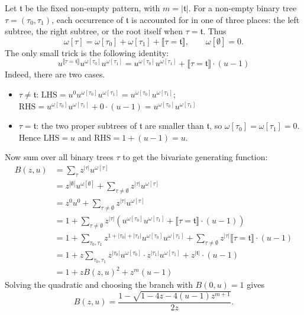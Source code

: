 Let $\mathfrak{t}$ be the fixed non-empty pattern, with $m=|\mathfrak{t}|$. For a non-empty
binary tree $\tau=(\tau_0,\tau_1)$, each occurrence of $\mathfrak{t}$ is accounted for in
one of three places: the left subtree, the right subtree, or the root itself when
$\tau=\mathfrak{t}$. Thus
\begin{equation*}
    \omega[\tau]=\omega[\tau_0]+\omega[\tau_1]+\llbracket \tau=\mathfrak{t}\rrbracket,
    \qquad \omega[\emptyset]=0.
\end{equation*}
The only small trick is the following identity:
\begin{equation*}
    u^{\llbracket \tau = \mathfrak{t} \rrbracket}u^{\omega[\tau_{0}]}u^{\omega[\tau_{1}]}
        = u^{\omega[\tau_{0}]}u^{\omega[\tau_{1}]} + \llbracket \tau = \mathfrak{t} \rrbracket \cdot (u - 1)
\end{equation*}
Indeed, there are two cases.
\begin{itemize}
    \item $\tau \neq \mathfrak{t}$:
        $\text{LHS} = u^{0}u^{\omega[\tau_{0}]}u^{\omega[\tau_{1}]} = u^{\omega[\tau_{0}]}u^{\omega[\tau_{1}]}$;
        $\text{RHS} = u^{\omega[\tau_{0}]}u^{\omega[\tau_{1}]} + 0 \cdot (u - 1) = u^{\omega[\tau_{0}]}u^{\omega[\tau_{1}]}$
    \item $\tau = \mathfrak{t}$:
        the two proper subtrees of $\mathfrak{t}$ are smaller than $\mathfrak{t}$, so
        $\omega[\tau_0]=\omega[\tau_1]=0$. Hence
        $\text{LHS}=u$ and $\text{RHS}=1+(u-1)=u$.
\end{itemize}
Now sum over all binary trees $\tau$ to get the bivariate generating function:
\begin{equation*}
    \begin{aligned}
        B(z, u)
        &= \sum_{\tau} z^{|\tau|}u^{\omega[\tau]} \\
        &= z^{|\emptyset|}u^{\omega[\emptyset]} + \sum_{\tau \neq \emptyset} z^{|\tau|}u^{\omega[\tau]} \\
        &= z^{0}u^{0} + \sum_{\tau \neq \emptyset} z^{|\tau|}u^{\omega[\tau]} \\
        &= 1 + \sum_{\tau \neq \emptyset} z^{|\tau|}
            \left(u^{\omega[\tau_{0}]}u^{\omega[\tau_{1}]} + \llbracket \tau = \mathfrak{t} \rrbracket \cdot (u - 1)\right) \\
        &= 1 + \sum_{\tau_{0}, \tau_{1}}z^{1 + |\tau_{0}| + |\tau_{1}|}u^{\omega[\tau_{0}]}u^{\omega[\tau_{1}]}
            + \sum_{\tau \neq \emptyset} z^{|\tau|}\llbracket \tau = \mathfrak{t} \rrbracket \cdot (u - 1) \\
        &= 1 + z \sum_{\tau_{0}, \tau_{1}}z^{|\tau_{0}|}u^{\omega[\tau_{0}]} \cdot z^{|\tau_{1}|}u^{\omega[\tau_{1}]}
            + z^{|\mathfrak{t}|} \cdot (u - 1) \\
        &= 1 + zB(z, u)^{2} + z^{m}(u - 1)
    \end{aligned}
\end{equation*}
Solving the quadratic and choosing the branch with $B(0,u)=1$ gives
\begin{equation*}
    B(z,u)
        =\frac{1-\sqrt{1-4z-4(u-1)z^{m+1}}}{2z}.
\end{equation*}

